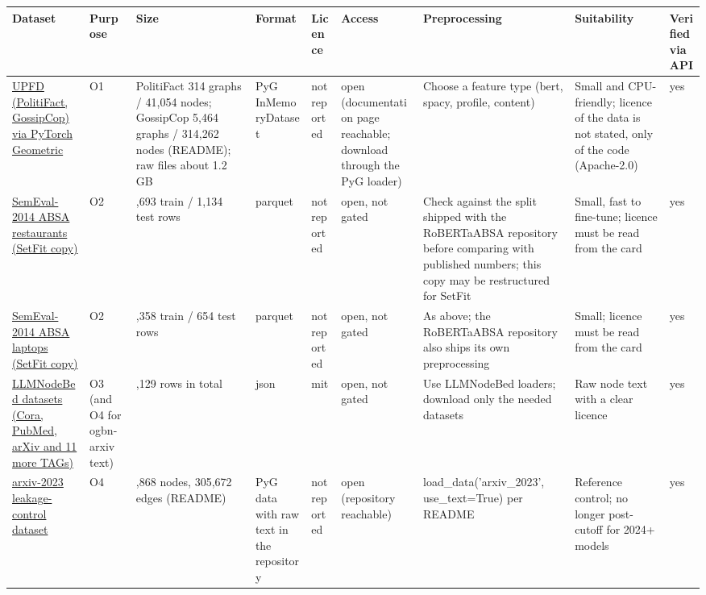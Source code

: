 \documentclass[11pt,a4paper]{article}
\begin{document}
{\small
\begin{longtable}{>{\raggedright\arraybackslash}p{}>{\raggedright\arraybackslash}p{}>{\raggedright\arraybackslash}p{}>{\raggedright\arraybackslash}p{}>{\raggedright\arraybackslash}p{}>{\raggedright\arraybackslash}p{}>{\raggedright\arraybackslash}p{}>{\raggedright\arraybackslash}p{}>{\raggedright\arraybackslash}p{}}
\toprule
\textbf{Dataset} & \textbf{Purpose} & \textbf{Size} & \textbf{Format} & \textbf{Licence} & \textbf{Access} & \textbf{Preprocessing} & \textbf{Suitability} & \textbf{Verified via API} \\
\midrule
\endhead
\href{https://pytorch-geometric.readthedocs.io/en/latest/generated/torch_geometric.datasets.UPFD.html}{UPFD (PolitiFact, GossipCop) via PyTorch Geometric} & O1 & PolitiFact 314 graphs / 41,054 nodes; GossipCop 5,464 graphs / 314,262 nodes (README); raw files about 1.2 GB & PyG InMemoryDataset & not reported & open (documentation page reachable; download through the PyG loader) & Choose a feature type (bert, spacy, profile, content) & Small and CPU-friendly; licence of the data is not stated, only of the code (Apache-2.0) & yes \\
\href{https://huggingface.co/datasets/tomaarsen/setfit-absa-semeval-restaurants}{SemEval-2014 ABSA restaurants (SetFit copy)} & O2 & 3,693 train / 1,134 test rows & parquet & not reported & open, not gated & Check against the split shipped with the RoBERTaABSA repository before comparing with published numbers; this copy may be restructured for SetFit & Small, fast to fine-tune; licence must be read from the card & yes \\
\href{https://huggingface.co/datasets/tomaarsen/setfit-absa-semeval-laptops}{SemEval-2014 ABSA laptops (SetFit copy)} & O2 & 2,358 train / 654 test rows & parquet & not reported & open, not gated & As above; the RoBERTaABSA repository also ships its own preprocessing & Small; licence must be read from the card & yes \\
\href{https://huggingface.co/datasets/xxwu/LLMNodeBed}{LLMNodeBed datasets (Cora, PubMed, arXiv and 11 more TAGs)} & O3 (and O4 for ogbn-arxiv text) & 857,129 rows in total & json & mit & open, not gated & Use LLMNodeBed loaders; download only the needed datasets & Raw node text with a clear licence & yes \\
\href{https://github.com/TRAIS-Lab/LLM-Structured-Data}{arxiv-2023 leakage-control dataset} & O4 & 33,868 nodes, 305,672 edges (README) & PyG data with raw text in the repository & not reported & open (repository reachable) & load\_data('arxiv\_2023', use\_text=True) per README & Reference control; no longer post-cutoff for 2024+ models & yes \\

\end{longtable}}
\end{document}
